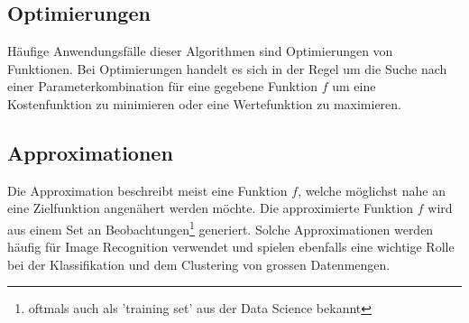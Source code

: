 \subsection{Optimierungen}
Häufige Anwendungsfälle dieser Algorithmen sind Optimierungen von Funktionen. Bei Optimierungen
handelt es sich in der Regel um die Suche nach einer Parameterkombination für eine gegebene Funktion $f$ um eine
Kostenfunktion zu minimieren oder eine Wertefunktion zu maximieren.

\subsection{Approximationen}
Die Approximation beschreibt meist eine Funktion $f$, welche möglichst nahe an eine Zielfunktion angenähert werden
möchte. Die approximierte Funktion $f$ wird aus einem Set an Beobachtungen\footnote{oftmals auch als 'training set' aus
der Data Science bekannt} generiert. Solche Approximationen werden häufig für Image Recognition verwendet
und spielen ebenfalls eine wichtige Rolle bei der Klassifikation und dem Clustering von grossen Datenmengen.